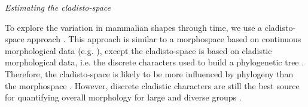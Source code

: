 \documentclass[12pt,letterpaper]{article}
\renewcommand{\subsection}[1]{%
\bigskip
\begin{center}
\begin{large}
\normalfont\itshape #1
\end{large}
\end{center}}
\begin{document}

\subsection{Estimating the cladisto-space} %
To explore the variation in mammalian shapes
through time, we use a cladisto-space approach \cite{Foote01071994,Foote29111996,Wesley-Hunt2005,Brusatte12092008,friedmanexplosive2010,toljagictriassic-jurassic2013}. This approach is similar to a morphospace based on continuous morphological data (e.g. \cite{finlay2015morphological}), except the cladisto-space is based on cladistic morphological data, i.e. the discrete characters used to build a phylogenetic tree 
. Therefore, the cladisto-space is likely to be more influenced by phylogeny than the morphospace \citep{Foote29111996,Wagner01011997}. However, discrete cladistic characters are still the best source for quantifying overall morphology for large and diverse groups \citep{Brusatte12092008}. %

\end{document}
